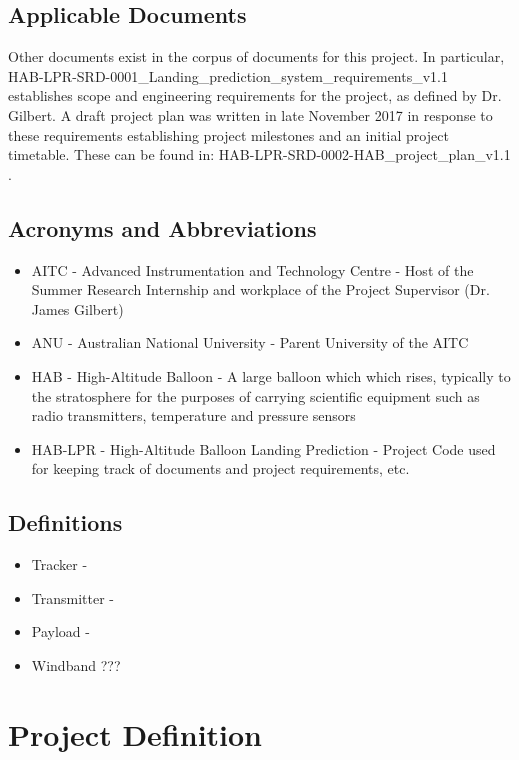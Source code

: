 \documentclass[11pt]{article}
\begin{document}
\subsection{Applicable Documents}
Other documents exist in the corpus of documents for this project. In particular, HAB-LPR-SRD-0001\_Landing\_prediction\_system\_requirements\_v1.1 establishes scope and engineering requirements for the project, as defined by Dr. Gilbert. A draft project plan was written in late November 2017 in response to these requirements establishing project milestones and an initial project timetable. These can be found in: HAB-LPR-SRD-0002-HAB\_project\_plan\_v1.1 .


\subsection{Acronyms and Abbreviations}

\begin{itemize}
\item AITC - Advanced Instrumentation and Technology Centre - Host of the Summer Research Internship and workplace of the Project Supervisor (Dr. James Gilbert)
\item ANU - Australian National University - Parent University of the AITC
\item HAB - High-Altitude Balloon - A large balloon which which rises, typically to the stratosphere for the purposes of carrying scientific equipment such as radio transmitters, temperature and pressure sensors
\item HAB-LPR - High-Altitude Balloon Landing Prediction - Project Code used for keeping track of documents and project requirements, etc.
\end{itemize}

\subsection{Definitions}

\begin{itemize}
\item Tracker - 
\item Transmitter -
\item Payload -
\item Windband ???
\end{itemize}


\section{Project Definition}
\end{document}
